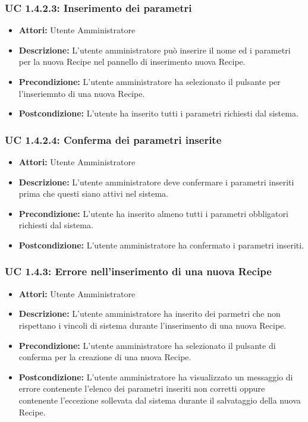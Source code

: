 \subsubsection{UC 1.4.2.3: Inserimento dei parametri}

\begin{itemize}
    \item \textbf{Attori:} Utente Amministratore
    \item \textbf{Descrizione:} L'utente amministratore può inserire il nome ed i parametri per la nuova Recipe nel pannello di inserimento nuova Recipe.
    \item \textbf{Precondizione:} L'utente amministratore ha selezionato il pulsante per l'inseriemnto di una nuova Recipe.
    \item \textbf{Postcondizione:} L'utente ha inserito tutti i parametri richiesti dal sistema.
\end{itemize}

\subsubsection{UC 1.4.2.4: Conferma dei parametri inserite}

\begin{itemize}
    \item \textbf{Attori:} Utente Amministratore
    \item \textbf{Descrizione:} L'utente amministratore deve confermare i parametri inseriti prima che questi siano attivi nel sistema.
    \item \textbf{Precondizione:} L'utente ha inserito almeno tutti i parametri obbligatori richiesti dal sistema.
    \item \textbf{Postcondizione:} L'utente amministratore ha confermato i parametri inseriti.
\end{itemize}

\subsubsection{UC 1.4.3: Errore nell'inserimento di una nuova Recipe}

\begin{itemize}
    \item \textbf{Attori:} Utente Amministratore
    \item \textbf{Descrizione:} L'utente amministratore ha inserito dei parmetri che non rispettano i vincoli di sistema durante l'inserimento di una nuova Recipe.
    \item \textbf{Precondizione:} L'utente amministratore ha selezionato il pulsante di conferma per la creazione di una nuova Recipe.
    \item \textbf{Postcondizione:} L'utente amministratore ha visualizzato un messaggio di errore contenente l'elenco dei parametri inseriti non corretti oppure contenente l'eccezione sollevata dal sistema durante il salvataggio della nuova Recipe.
\end{itemize}


